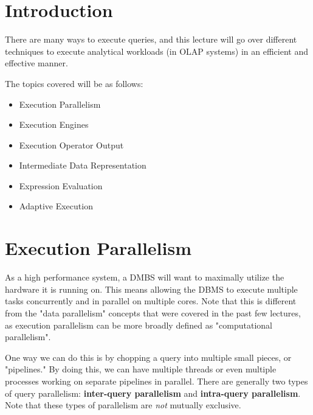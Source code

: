 \documentclass[11pt]{article}
\begin{document}
\maketitle
\thispagestyle{plain}



\section{Introduction}

There are many ways to execute queries, and this lecture will go over different
techniques to execute analytical workloads (in OLAP systems) in an efficient
and effective manner.

The topics covered will be as follows:
\begin{itemize}
    \item Execution Parallelism
    \item Execution Engines
    \item Execution Operator Output
    \item Intermediate Data Representation
    \item Expression Evaluation
    \item Adaptive Execution
\end{itemize}




\section{Execution Parallelism}

As a high performance system, a DMBS will want to maximally utilize the
hardware it is running on. This means allowing the DBMS to execute multiple
tasks concurrently and in parallel on multiple cores. Note that this is
different from the "data parallelism" concepts that were covered in the past
few lectures, as execution parallelism can be more broadly defined as
"computational parallelism".

One way we can do this is by chopping a query into multiple small pieces,
or "pipelines." By doing this, we can have multiple threads or even multiple
processes working on separate pipelines in parallel. There are generally two
types of query parallelism: \textbf{inter-query parallelism}
and \textbf{intra-query parallelism}. Note that these types of parallelism are
\textit{not} mutually exclusive.
\\
\end{document}
